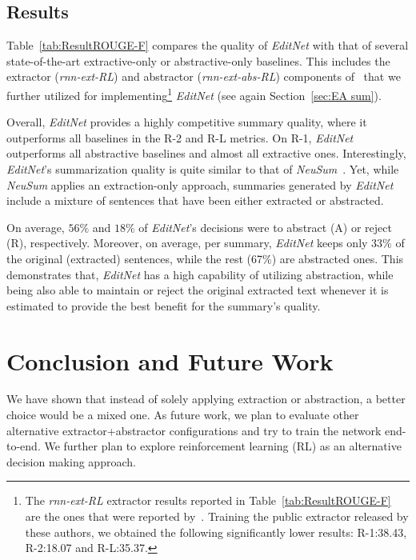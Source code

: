 \documentclass{article}
\begin{document}
\subsection{Results}
Table~\ref{tab:ResultROUGE-F} compares the quality of \textit{EditNet} with that of several state-of-the-art extractive-only or abstractive-only baselines. This includes the extractor (\textit{rnn-ext-RL}) and abstractor (\textit{rnn-ext-abs-RL}) components of~\cite{ChenFastAS2018} that we further utilized for implementing\footnote{\small The \textit{rnn-ext-RL} extractor results reported in Table~\ref{tab:ResultROUGE-F} are the ones that were reported by~\cite{ChenFastAS2018}. Training the public extractor released by these authors, we obtained the following significantly lower results: R-1:38.43, R-2:18.07 and R-L:35.37.} \textit{EditNet} (see again Section~\ref{sec:EA sum}).

Overall, \textit{EditNet} provides a highly competitive summary quality, where it outperforms all baselines in the R-2 and R-L metrics. On R-1, \textit{EditNet} outperforms all abstractive baselines and almost all extractive ones. 
Interestingly, \textit{EditNet}'s summarization quality is quite similar to that of \textit{NeuSum}~\cite{Qingyu2018}. Yet, while \textit{NeuSum} applies an extraction-only approach, summaries generated by \textit{EditNet} include a mixture of sentences that have been either extracted or abstracted.

On average, $56\%$ and $18\%$ of \textit{EditNet}'s decisions were to abstract (\textsf{A}) or reject (\textsf{R}), respectively. Moreover, on average, per summary, \textit{EditNet} keeps only 33\% of the original (extracted) sentences, while the rest (67\%) are abstracted ones. 
This demonstrates that, \textit{EditNet} has a high capability of utilizing abstraction, while being also able to maintain or reject the original extracted text whenever it is estimated to provide the best benefit for the summary's quality.


\section{Conclusion and Future Work}
We have shown that instead of solely applying extraction or abstraction, a better choice would be a mixed one. As future work, we plan to evaluate other alternative extractor+abstractor configurations and try to train the network end-to-end. We further plan to explore reinforcement learning (RL) as an alternative decision making approach.
\end{document}
